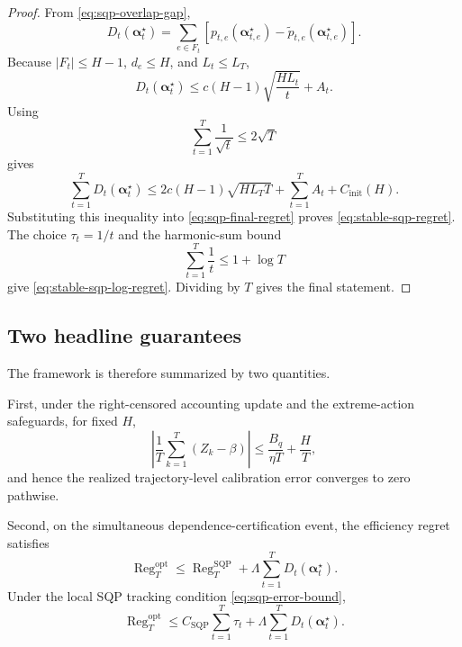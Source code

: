 \documentclass[11pt]{article}
\newcommand{\Reg}{\operatorname{Reg}}
\begin{document}
\begin{proof}
From \eqref{eq:sqp-overlap-gap},
\[
    D_t(\bm\alpha_t^\star)
    =
    \sum_{e\in F_t}
    \left[
        p_{t,e}(\bm\alpha_{t,e}^\star)
        -
        \widetilde p_{t,e}(\bm\alpha_{t,e}^\star)
    \right].
\]
Because $|F_t|\le H-1$, $d_e\le H$, and $L_t\le L_T$,
\[
    D_t(\bm\alpha_t^\star)
    \le
    c(H-1)
    \sqrt{
        \frac{HL_t}{t}
    }
    +
    A_t.
\]
Using
\[
    \sum_{t=1}^{T}\frac1{\sqrt t}
    \le
    2\sqrt T
\]
gives
\[
    \sum_{t=1}^{T}
    D_t(\bm\alpha_t^\star)
    \le
    2c(H-1)
    \sqrt{
        HL_TT
    }
    +
    \sum_{t=1}^{T}A_t
    +
    C_{\mathrm{init}}(H).
\]
Substituting this inequality into
\eqref{eq:sqp-final-regret} proves
\eqref{eq:stable-sqp-regret}.  The choice $\tau_t=1/t$ and the harmonic-sum
bound
\[
    \sum_{t=1}^{T}\frac1t
    \le
    1+\log T
\]
give \eqref{eq:stable-sqp-log-regret}.  Dividing by $T$ gives the final
statement.
\end{proof}

\subsection{Two headline guarantees}

The framework is therefore summarized by two quantities.

First, under the right-censored accounting update and the extreme-action
safeguards, for fixed $H$,
\begin{equation}
\boxed{
    \left|
        \frac1T
        \sum_{k=1}^{T}
        (Z_k-\beta)
    \right|
    \le
    \frac{B_q}{\eta T}
    +
    \frac{H}{T},
}
\label{eq:headline-calibration}
\end{equation}
and hence the realized trajectory-level calibration error converges to zero
pathwise.

Second, on the simultaneous dependence-certification event, the efficiency
regret satisfies
\begin{equation}
\boxed{
    \Reg_T^{\mathrm{opt}}
    \le
    \Reg_T^{\mathrm{SQP}}
    +
    \Lambda
    \sum_{t=1}^{T}
    D_t(\bm\alpha_t^\star).
}
\label{eq:headline-sqp-regret}
\end{equation}
Under the local SQP tracking condition
\eqref{eq:sqp-error-bound},
\begin{equation}
\boxed{
    \Reg_T^{\mathrm{opt}}
    \le
    C_{\mathrm{SQP}}
    \sum_{t=1}^{T}\tau_t
    +
    \Lambda
    \sum_{t=1}^{T}
    D_t(\bm\alpha_t^\star).
}
\label{eq:headline-sqp-regret-explicit}
\end{equation}
\end{document}
